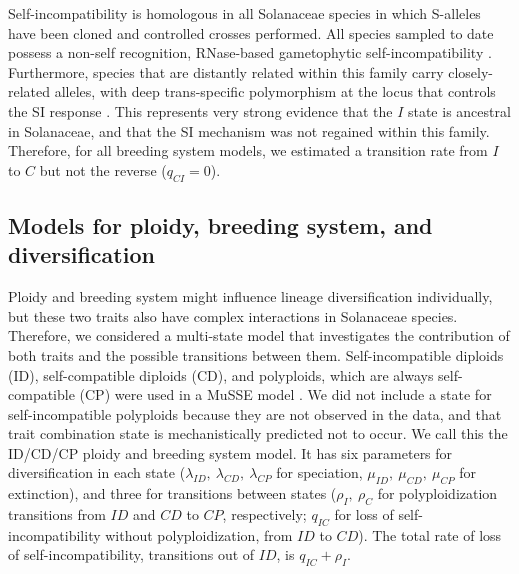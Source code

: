 Self-incompatibility is homologous in all Solanaceae species in which S-alleles have been cloned and controlled crosses performed.
All species sampled to date possess a non-self recognition, RNase-based gametophytic self-incompatibility \citep[shared even with other euasterid families;][]{ramanauskas_2017}.
Furthermore, species that are distantly related within this family carry closely-related alleles, with deep trans-specific polymorphism at the locus that controls the SI response \citep{ioerger_1990, igic_2006}.
This represents very strong evidence that the $I$ state is ancestral in Solanaceae, and that the SI mechanism was not regained within this family.
Therefore, for all breeding system models, we estimated a transition rate from $I$ to $C$  but not the reverse ($q_{CI}=0$).
%

\subsection{Models for ploidy, breeding system, and diversification}

Ploidy and breeding system might influence lineage diversification individually, but these two traits also have complex interactions in Solanaceae species.
Therefore, we considered a multi-state model that investigates the contribution of both traits and the possible transitions between them.
Self-incompatible diploids (ID), self-compatible diploids (CD), and polyploids, which are always self-compatible (CP) were used in a MuSSE model \citep{fitzjohn_2012}.
We did not include a state for self-incompatible polyploids because they are not observed in the data, and  that trait combination state is mechanistically predicted not to occur.
We call this the ID/CD/CP ploidy and breeding system model.
It has six parameters for diversification in each state ($\lambda_{ID},\ \lambda_{CD},\ \lambda_{CP}$ for speciation, $\mu_{ID},\ \mu_{CD},\ \mu_{CP}$ for extinction), and three for transitions between states ($\rho_I,\ \rho_C$ for polyploidization transitions from $ID$ and $CD$ to $CP$, respectively; $q_{IC}$ for loss of self-incompatibility without polyploidization, from $ID$ to $CD$).
The total rate of loss of self-incompatibility, \ie transitions out of $ID$, is $q_{IC} + \rho_I$.

